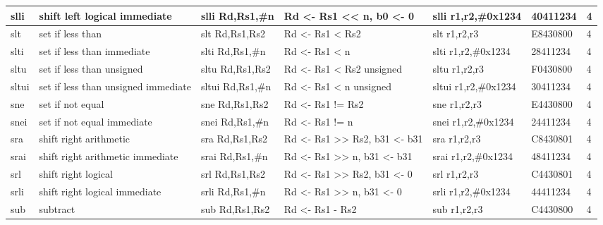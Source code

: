 \documentclass[a4paper,9pt]{extarticle}
\begin{document}
{\begin{tabular}{| p{0.6cm} | p{4cm} | p{3cm} | p{4cm} | p{3cm} | l | l | }
        slli    & shift left logical immediate          & slli Rd,Rs1,\#n       & Rd <- Rs1 << n, b0 <- 0               & slli r1,r2,\#0x1234                   & 40411234  & 4\\ \hline
        slt     & set if less than                      & slt Rd,Rs1,Rs2        & Rd <- Rs1 < Rs2                       & slt r1,r2,r3                          & E8430800  & 4\\ \hline
        slti    & set if less than immediate            & slti Rd,Rs1,\#n       & Rd <- Rs1 < n                         & slti r1,r2,\#0x1234                   & 28411234  & 4\\ \hline
        sltu    & set if less than unsigned             & sltu Rd,Rs1,Rs2       & Rd <- Rs1 < Rs2 unsigned              & sltu r1,r2,r3                         & F0430800  & 4\\ \hline
        sltui   & set if less than unsigned immediate   & sltui Rd,Rs1,\#n      & Rd <- Rs1 < n unsigned                & sltui r1,r2,\#0x1234                  & 30411234  & 4\\ \hline
        sne     & set if not equal                      & sne Rd,Rs1,Rs2        & Rd <- Rs1 != Rs2                      & sne r1,r2,r3                          & E4430800  & 4\\ \hline
        snei    & set if not equal immediate            & snei Rd,Rs1,\#n       & Rd <- Rs1 != n                        & snei r1,r2,\#0x1234                   & 24411234  & 4\\ \hline
        sra     & shift right arithmetic                & sra Rd,Rs1,Rs2        & Rd <- Rs1 >> Rs2, b31 <- b31          & sra r1,r2,r3                          & C8430801  & 4\\ \hline
        srai    & shift right arithmetic immediate      & srai Rd,Rs1,\#n       & Rd <- Rs1 >> n, b31 <- b31            & srai r1,r2,\#0x1234                   & 48411234  & 4\\ \hline
        srl     & shift right logical                   & srl Rd,Rs1,Rs2        & Rd <- Rs1 >> Rs2, b31 <- 0            & srl r1,r2,r3                          & C4430801  & 4\\ \hline
        srli    & shift right logical immediate         & srli Rd,Rs1,\#n       & Rd <- Rs1 >> n, b31 <- 0              & srli r1,r2,\#0x1234                   & 44411234  & 4\\ \hline
        sub     & subtract                              & sub Rd,Rs1,Rs2        & Rd <- Rs1 - Rs2                       & sub r1,r2,r3                          & C4430800  & 4\\ \hline

\end{tabular}}
\end{document}
